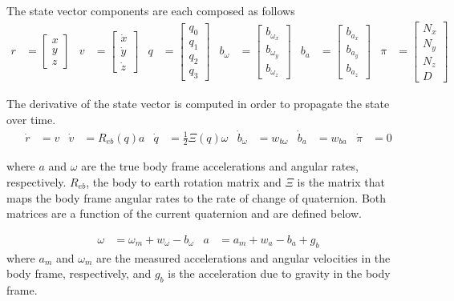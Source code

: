 \documentclass[]{article}
\begin{document}
{The state vector components are each composed as follows
\begin{align}
	r &= 
	\left[
	\begin{matrix}
		x \\
		y \\
		z
	\end{matrix}
	\right]
	&
	v &=
	\left[
	\begin{matrix}
		\dot{x} \\
		\dot{y} \\
		\dot{z}
	\end{matrix}
	\right]
	&
	q &=
	\left[
	\begin{matrix}
		q_0 \\
		q_1 \\
		q_2 \\
		q_3
	\end{matrix}
	\right]
	&
	b_\omega &=
	\left[
	\begin{matrix}
		b_{\omega_x} \\
		b_{\omega_y} \\
		b_{\omega_z} 
	\end{matrix}
	\right]
	&
	b_a &=
	\left[
	\begin{matrix}
		b_{a_x} \\
		b_{a_y} \\
		b_{a_z} 
	\end{matrix}
	\right]
	&
	\pi &=
	\left[
	\begin{matrix}
		N_x \\
		N_y \\
		N_z \\
		D
	\end{matrix}
	\right]
\end{align}

The derivative of the state vector is computed in order to propagate the state over time.
\begin{align}
	\dot{r} &= v
	&
	\dot{v} &= R_{eb}(q) a
	&
	\dot{q} &= \frac{1}{2}\Xi(q) \omega
	&
	\dot{b}_\omega &= w_{b\omega}
	&
	\dot{b}_a &= w_{ba}
	&
	\dot{\pi} &= 0
\end{align}

where $a$ and $\omega$ are the true body frame accelerations and angular rates, respectively.
$R_{eb}$, the body to earth rotation matrix and $\Xi$ is the matrix that maps the body frame angular rates to the rate of change of quaternion. Both matrices are a function of the current quaternion and are defined below.

\begin{align}
	\omega &= \omega_m + w_\omega - b_\omega &
	a &= a_m + w_a - b_a + g_b
\end{align}
where $a_m$ and $\omega_m$ are the measured accelerations and angular velocities in the body frame, respectively, and $g_b$ is the acceleration due to gravity in the body frame.

}
\end{document}
